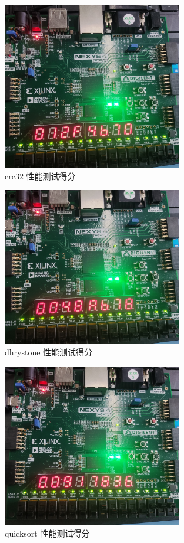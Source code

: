 \begin{figure}[htbp]
    \centering
    \includegraphics[width=0.7\textwidth]{image/per4.jpg}
    \caption{crc32 性能测试得分}
    \label{fig:per4}
\end{figure}
\begin{figure}[htbp]
    \centering
    \includegraphics[width=0.7\textwidth]{image/per5.jpg}
    \caption{dhrystone 性能测试得分}
    \label{fig:per5}
\end{figure}
\begin{figure}[htbp]
    \centering
    \includegraphics[width=0.7\textwidth]{image/per6.jpg}
    \caption{quicksort 性能测试得分}
    \label{fig:per6}
\end{figure}
